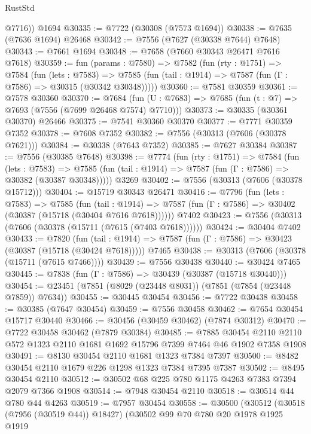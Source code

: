 \begin{lexlean}{RustStd}
\begin{coremodule}
        @7716))
    @1694
@30335 := @7722 (@30308 (@7573 @1694))
@30338 := @7635 (@7636 @1694) @26468
@30342 := @7556 (@7627 (@30338 @7644) @7648)
@30343 := @7661 @1694
@30348 := @7658 (@7660 @30343 @26471 @7616 @7618)
@30359 := fun (params : @7580) =>
  @7582
    (fun (rty : @1751) =>
    @7584
      (fun (lets : @7583) =>
      @7585 (fun (tail : @1914) => @7587 (fun (Γ : @7586) => @30315 (@30342 @30348)))))
@30360 := @7581 @30359
@30361 := @7578 @30360
@30370 := @7684
    (fun (U : @7683) => @7685 (fun (t : @7) => @7693 (@7556 (@7699 @26468 @7574) @7710)))
@30373 := @30335 (@30361 @30370) @26466
@30375 := @7541 @30360 @30370
@30377 := @7771 @30359 @7352
@30378 := @7608 @7352
@30382 := @7556 (@30313 (@7606 (@30378 @7621)))
@30384 := @30338 (@7643 @7352)
@30385 := @7627 @30384
@30387 := @7556 (@30385 @7648)
@30398 := @7774
    (fun (rty : @1751) =>
    @7584
      (fun (lets : @7583) =>
      @7585 (fun (tail : @1914) => @7587 (fun (Γ : @7586) => @30382 (@30387 @30348)))))
    @3269
@30402 := @7556 (@30313 (@7606 (@30378 @15712)))
@30404 := @15719 @30343 @26471
@30416 := @7796
    (fun (lets : @7583) =>
    @7585
      (fun (tail : @1914) =>
      @7587 (fun (Γ : @7586) => @30402 (@30387 (@15718 (@30404 @7616 @7618))))))
    @7402
@30423 := @7556 (@30313 (@7606 (@30378 (@15711 (@7615 (@7403 @7618))))))
@30424 := @30404 @7402
@30433 := @7820
    (fun (tail : @1914) => @7587 (fun (Γ : @7586) => @30423 (@30387 (@15718 (@30424 @7618)))))
    @7465
@30438 := @30313 (@7606 (@30378 (@15711 (@7615 @7466))))
@30439 := @7556 @30438
@30440 := @30424 @7465
@30445 := @7838 (fun (Γ : @7586) => @30439 (@30387 (@15718 @30440)))
@30454 := @23451 (@7851 (@8029 (@23448 @8031)) (@7851 (@7854 (@23448 @7859)) @7634))
@30455 := @30445 @30454
@30456 := @7722 @30438
@30458 := @30385 (@7647 @30454)
@30459 := @7556 @30458
@30462 := @7654 @30454 @15717 @30440
@30466 := @30456 (@30459 @30462) (@7874 @30312)
@30470 := @7722 @30458 @30462 (@7879 @30384)
@30485 := @7885
    @30454
    @2110
    @2110
    @572
    @1323
    @2110
    @1681
    @1692
    @15796
    @7399
    @7464
    @46
    @1902
    @7358
    @1908
@30491 := @8130 @30454 @2110 @1681 @1323 @7384 @7397
@30500 := @8482 @30454 @2110 @1679 @226 @1298 @1323 @7384 @7395 @7387
@30502 := @8495 @30454 @2110
@30512 := @30502 @68 @225 @780 @1175 @4263 @7383 @7394 @2079 @7366 @1908
@30514 := @7948 @30454 @2110
@30518 := @30514 @44 @780 @44 @4263
@30519 := @7957 @30454
@30558 := @30500
    (@30512
      (@30518 (@7956 (@30519 @44)) @18427)
      (@30502
        @99
        @70
        @780
        @20
        @1978
        @1925
        @1919

\end{coremodule}
\end{lexlean}
